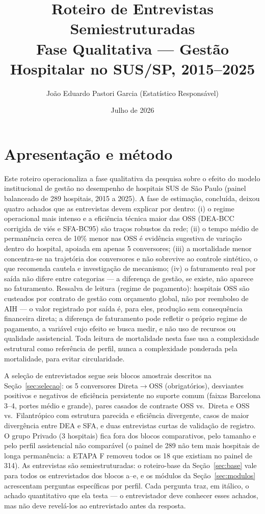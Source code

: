 \documentclass[12pt,a4paper]{article}
\title{Roteiro de Entrevistas Semiestruturadas\\
  {\large Fase Qualitativa --- Gest\~ao Hospitalar no SUS/SP, 2015--2025}}
\author{Jo\~ao Eduardo Pastori Garcia (Estat\'istico Respons\'avel)}
\date{Julho de 2026}
\begin{document}
\maketitle
\tableofcontents
\clearpage

\section{Apresentação e método}

Este roteiro operacionaliza a fase qualitativa da pesquisa sobre o efeito
do modelo institucional de gestão no desempenho de hospitais SUS de São
Paulo (painel balanceado de 289 hospitais, 2015 a 2025). A fase de
estimação, concluída, deixou quatro achados que as entrevistas devem
explicar por dentro: (i) o regime operacional mais intenso e a eficiência
técnica maior das OSS (DEA-BCC corrigida de viés e SFA-BC95) são traços
robustos da rede; (ii) o tempo médio de permanência cerca de 10\% menor
nas OSS é evidência sugestiva de variação dentro do hospital, apoiada em
apenas 5 conversores; (iii) a mortalidade menor concentra-se na
trajetória dos conversores e não sobrevive ao controle sintético, o que
recomenda cautela e investigação de mecanismo; (iv) o faturamento real por
saída não difere entre categorias --- a diferença de gestão, se existe,
não aparece no faturamento. Ressalva de leitura (regime de pagamento):
hospitais OSS são custeados por contrato de gestão com orçamento global,
não por reembolso de AIH --- o valor registrado por saída é, para eles,
produção sem consequência financeira direta; a diferença de faturamento
pode refletir o próprio regime de pagamento, a variável cujo efeito se
busca medir, e não uso de recursos ou qualidade assistencial. Toda
leitura de mortalidade nesta fase usa a
complexidade estrutural como referência de perfil, nunca a complexidade
ponderada pela mortalidade, para evitar circularidade.

A seleção de entrevistados segue seis blocos amostrais descritos na
Seção~\ref{sec:selecao}: os 5 conversores Direta$\to$OSS (obrigatórios),
desviantes positivos e negativos de eficiência persistente no suporte
comum (faixas Barcelona 3--4, portes médio e grande), pares casados de
contraste OSS vs.\ Direta e OSS vs.\ Filantrópico com estrutura parecida
e eficiência divergente, casos de maior divergência entre DEA e SFA, e
duas entrevistas curtas de validação de registro. O grupo Privado (3
hospitais) fica fora dos blocos comparativos, pelo tamanho e pelo
perfil assistencial não comparável (o painel de 289 não tem mais
hospitais de longa permanência: a ETAPA F removeu todos os 18 que
existiam no painel de 314). As
entrevistas são semiestruturadas: o roteiro-base da Seção~\ref{sec:base}
vale para todos os entrevistados dos blocos a--e, e os módulos da
Seção~\ref{sec:modulos} acrescentam perguntas específicas por perfil.
Cada pergunta traz, em itálico, o achado quantitativo que ela testa ---
o entrevistador deve conhecer esses achados, mas não deve revelá-los ao
entrevistado antes da resposta.
\end{document}

